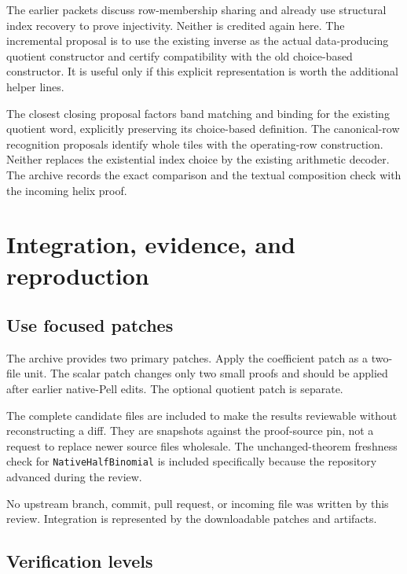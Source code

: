 \documentclass[11pt]{article}
\newcommand{\code}[1]{\ifmmode\text{\ttfamily\detokenize{#1}}\else\nolinkurl{#1}\fi}
\begin{document}
The earlier packets discuss row-membership sharing and already use structural index
recovery to prove injectivity. Neither is credited again here. The incremental
proposal is to use the existing inverse as the actual data-producing quotient
constructor and certify compatibility with the old choice-based constructor.
It is useful only if this explicit representation is worth the additional helper
lines.

The closest closing proposal factors band matching and binding for the existing
quotient word, explicitly preserving its choice-based definition. The canonical-row
recognition proposals identify whole tiles with the operating-row construction.
Neither replaces the existential index choice by the existing arithmetic decoder.
The archive records the exact comparison and the textual composition check with
the incoming helix proof.

\section{Integration, evidence, and reproduction}

\subsection{Use focused patches}

The archive provides two primary patches. Apply the coefficient patch
as a two-file unit. The scalar patch changes
only two small proofs and should be applied after earlier native-Pell edits.
The optional quotient patch is separate.

The complete candidate files are included to make the results reviewable without
reconstructing a diff. They are snapshots against the proof-source pin, not a request
to replace newer source files wholesale. The unchanged-theorem freshness check for
\code{NativeHalfBinomial} is included specifically because the repository advanced
during the review.

No upstream branch, commit, pull request, or incoming file was written by this
review. Integration is represented by the downloadable patches and artifacts.

\subsection{Verification levels}
\end{document}
